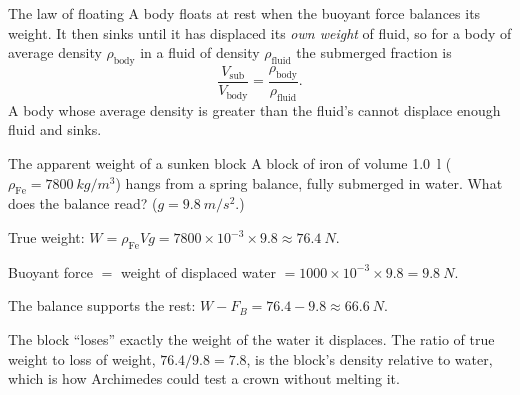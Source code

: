 \begin{keybox}{The law of floating}
A body floats at rest when the buoyant force balances its weight. It then sinks until it has displaced its
\emph{own weight} of fluid, so for a body of average density $\rho_{\text{body}}$ in a fluid of density
$\rho_{\text{fluid}}$ the submerged fraction is
\[
\frac{V_{\text{sub}}}{V_{\text{body}}}=\frac{\rho_{\text{body}}}{\rho_{\text{fluid}}}.
\]
A body whose average density is greater than the fluid's cannot displace enough fluid and sinks.
\end{keybox}


\begin{exbox}{The apparent weight of a sunken block}\label{ex:fluids-ironblock}
A block of iron of volume \SI{1.0}{\litre} ($\rho_{\text{Fe}}=\SI{7800}{kg/m^3}$) hangs from a spring
balance, fully submerged in water. What does the balance read? ($g=\SI{9.8}{m/s^2}$.)

 True weight: $W=\rho_{\text{Fe}}Vg=7800\times10^{-3}\times9.8\approx\SI{76.4}{N}$.

 Buoyant force $=$ weight of displaced water $=1000\times10^{-3}\times9.8=\SI{9.8}{N}$.

 The balance supports the rest: $W-F_B=76.4-9.8\approx\SI{66.6}{N}$.

\medskip
The block ``loses'' exactly the weight of the water it displaces. The ratio of true weight to loss of
weight, $76.4/9.8=7.8$, is the block's density relative to water, which is how Archimedes could test a crown
without melting it. 
\end{exbox}


